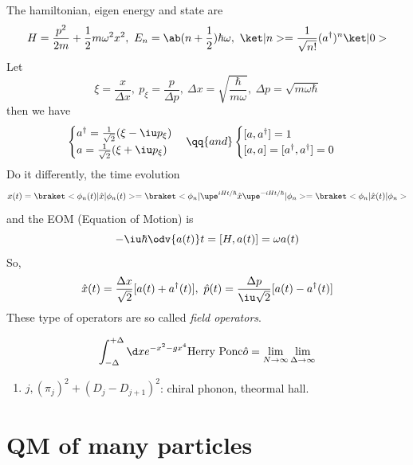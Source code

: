 The hamiltonian, eigen energy and state are
\begin{equation}
  H = \frac{p^2}{2m} + \frac12 m\omega^2x^2,~
  E_n = \ab(n + \frac12)\hbar\omega,~
  \ket|n> = \frac{1}{\sqrt{n!}}(a^\dagger)^n\ket|0>
\end{equation}
Let
\[
  \xi = \frac x{\Delta x},~               p_\xi = \frac p{\Delta p},~
  \Delta x = \sqrt{\frac\hbar{m\omega}},~ \Delta p = \sqrt{m\omega\hbar}
\]
then we have
\begin{equation}
  \begin{cases}
    a^\dagger = \frac1{\sqrt2}(\xi - \iu p_\xi)\\
    a         = \frac1{\sqrt2}(\xi + \iu p_\xi)
  \end{cases} \qq{and}
  \begin{cases}
    [a,a^\dagger] = 1\\
    [a,a] = [a^\dagger,a^\dagger] = 0
  \end{cases}
\end{equation}
Do it differently, the time evolution
\begin{equation}
  x(t) = \braket<\phi_n(t)|\hat x|\phi_n(t)>
  = \braket<\phi_n|\upe^{iHt/\hbar} \hat x\upe^{-iHt/\hbar}|\phi_n>
  = \braket<\phi_n|\hat x(t)|\phi_n>
\end{equation}
and the EOM (Equation of Motion) is
\begin{equation}
  -\iu\hbar\odv{a(t)}t = [H,a(t)] = \omega a(t)
\end{equation}
So,
\begin{equation}
  \hat x(t) = \frac{\Delta x}{\sqrt2}[a(t) + a^\dagger(t)],~
  \hat p(t) = \frac{\Delta p}{\iu\sqrt2}[a(t) - a^\dagger(t)]
\end{equation}
These type of operators are so called \emph{field operators}.

\begin{equation}
  \int_{-\Delta}^{+\Delta}\d xe^{-x^2-gx^4} \text{Herry Ponc$\hat o$}
= \lim_{N \to \infty} \lim_{\Delta \to \infty}
\end{equation}
\begin{enumerate}
  \item $j, (\pi_j)^2 + (D_j - D_{j+1})^2$: chiral phonon, theormal hall.
\end{enumerate}

\section{QM of many particles}

